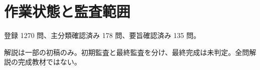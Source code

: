 \chapter{作業状態と監査範囲}
登録 1270 問、主分類確認済み 178 問、要旨確認済み 135 問。
\par 解説は一部の初稿のみ。初期監査と最終監査を分け、最終完成は未判定。全問解説の完成教材ではない。
